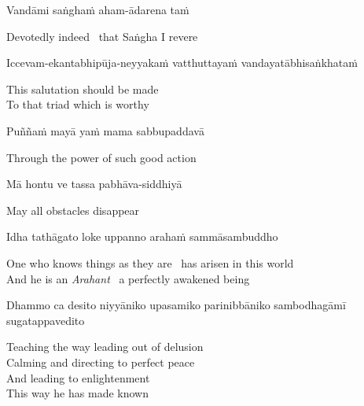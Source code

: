 Vandāmi saṅghaṁ aham-ādarena taṁ

\begin{english}
  Devotedly indeed \breathmark\ that Saṅgha I revere
\end{english}

\begin{pali-hang}
  Iccevam-ekantabhipūja-neyyakaṁ vatthuttayaṁ vandayatābhisaṅkhataṁ
\end{pali-hang}

\begin{english}
  This salutation should be made\\
  To that triad\hyperlink{endnote11-appendix}{\hypertarget{endnote11-body}{}}
  which is worthy
\end{english}

Puññaṁ mayā yaṁ mama sabbupaddavā

\begin{english}
  Through the power of such good action
\end{english}

Mā hontu ve tassa pabhāva-siddhiyā

\begin{english}
  May all obstacles disappear
\end{english}

Idha tathāgato loke uppanno arahaṁ sammāsambuddho

\begin{english}
  One who knows things as they are \breathmark\ has arisen in this world\hyperlink{endnote12-appendix}{\hypertarget{endnote12-body}{}}\\
  And he is an \textit{Arahant} \breathmark\ a perfectly awakened being
\end{english}

\begin{pali-hang}
  Dhammo ca desito niyyāniko upasamiko parinibbāniko sambodhagāmī sugatappavedito
\end{pali-hang}

\begin{english}
  Teaching the way leading out of delusion\hyperlink{endnote13-appendix}{\hypertarget{endnote13-body}{}}\\
  Calming and directing to perfect peace\\
  And leading to enlightenment\\
  This way he has made known\\
\end{english}

